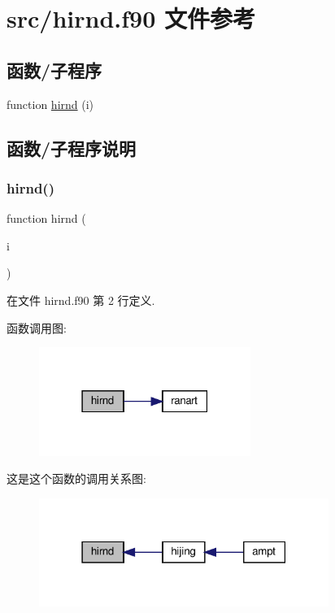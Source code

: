 \hypertarget{hirnd_8f90}{}\section{src/hirnd.f90 文件参考}
\label{hirnd_8f90}
\subsection*{函数/子程序}
\begin{DoxyCompactItemize}
\item 
function \mbox{\hyperlink{hirnd_8f90_ab81351f85548d91e220329f01058cffd}{hirnd}} (i)
\end{DoxyCompactItemize}


\subsection{函数/子程序说明}
\mbox{\label{hirnd_8f90_ab81351f85548d91e220329f01058cffd}} 
\subsubsection{\texorpdfstring{hirnd()}{hirnd()}}
{\footnotesize\ttfamily function hirnd (\begin{DoxyParamCaption}\item[{}]{i }\end{DoxyParamCaption})}



在文件 hirnd.\+f90 第 2 行定义.

函数调用图\+:
\nopagebreak
\begin{figure}[H]
\begin{center}
\leavevmode
\includegraphics[width=195pt]{hirnd_8f90_ab81351f85548d91e220329f01058cffd_cgraph}
\end{center}
\end{figure}
这是这个函数的调用关系图\+:
\nopagebreak
\begin{figure}[H]
\begin{center}
\leavevmode
\includegraphics[width=267pt]{hirnd_8f90_ab81351f85548d91e220329f01058cffd_icgraph}
\end{center}
\end{figure}
